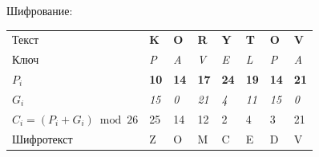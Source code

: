 \documentclass[a4paper, 14pt]{extarticle}
\begin{document}
\begin{enumerate}
    Шифрование:
    \begin{table}[h]
        \centering
        \begin{tabular}{@{}llllllll@{}}
        \toprule
        Текст & \textbf{K} & \textbf{O} & \textbf{R} & \textbf{Y} & \textbf{T} & \textbf{O} & \textbf{V} \\
        Ключ & \textit{P} & \textit{A} & \textit{V} & \textit{E} & \textit{L} & \textit{P} & \textit{A} \\ \midrule
        $P_i$ & \textbf{10} & \textbf{14} & \textbf{17} & \textbf{24} & \textbf{19} & \textbf{14} & \textbf{21} \\
        $G_i$ & \textit{15} & \textit{0} & \textit{21} & \textit{4} & \textit{11} & \textit{15} & \textit{0} \\ \midrule
        $C_i = (P_i + G_i) \bmod 26$ & 25 & 14 & 12 & 2 & 4 & 3 & 21 \\
        Шифротекст & Z & O & M & C & E & D & V \\
        \bottomrule
    \end{tabular}
    \end{table}
    

\end{enumerate}
\end{document}
